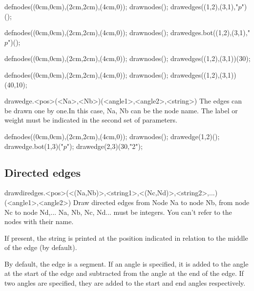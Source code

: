 \documentclass[11pt,a4paper,english]{article}
\begin{document}
\begin{exemple}[lefthand ratio = 0.6]
defnodes((0cm,0cm),(2cm,2cm),(4cm,0));
drawnodes();
drawedges((1,2),(3,1),"$p$")();
\end{exemple}

\begin{exemple}[lefthand ratio = 0.6]
defnodes((0cm,0cm),(2cm,2cm),(4cm,0));
drawnodes();
drawedges.bot((1,2),(3,1),"$p$")();
\end{exemple}

\begin{exemple}[lefthand ratio = 0.6]
defnodes((0cm,0cm),(2cm,2cm),(4cm,0));
drawnodes();
drawedges((1,2),(3,1))(30);
\end{exemple}

\begin{exemple}[lefthand ratio = 0.6]
defnodes((0cm,0cm),(2cm,2cm),(4cm,0));
drawnodes();
drawedges((1,2),(3,1))(40,10);
\end{exemple}



\begin{rplabel}{drawedge.<pos>(<Na>,<Nb>)(<angle1>,<angle2>,<string>)}
The edges can be drawn one by one.In this case, Na, Nb can be the node name.  The label or weight must be indicated in the second set of parameters.
\end{rplabel}

\begin{exemple}[lefthand ratio = 0.6]
defnodes((0cm,0cm),(2cm,2cm),(4cm,0));
drawnodes();
drawedge(1,2)();
drawedge.bot(1,3)("$p$");
drawedge(2,3)(30,"2");
\end{exemple}

\subsection{Directed edges}

\begin{rplabel}{drawdiredges.<pos>(<(Na,Nb)>,<string1>,<(Nc,Nd)>,<string2>,...)(<angle1>,<angle2>)}
Draw directed edges from Node Na to node Nb, from node Nc to node Nd,... Na, Nb, Nc, Nd... must be integers. You can't refer to the nodes with their name.

If present, the string is printed at the position indicated in relation to the middle of the edge (by default).

By default, the edge is a segment. If an angle is specified, it is added to the angle at the start of the edge and subtracted from the angle at the end of the edge. If two angles are specified, they are added to the start and end angles respectively.
\end{rplabel}
\end{document}
